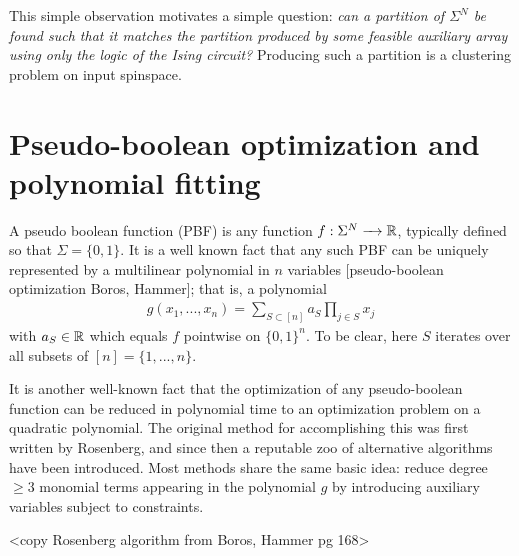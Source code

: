 \documentclass{article}
\begin{document}
This simple observation motivates a simple question: \emph{can a partition of $\Sigma^N$ be found such that it matches the partition produced by some feasible auxiliary array using only the logic of the Ising circuit?} Producing such a partition is a clustering problem on input spinspace.

\section{Pseudo-boolean optimization and polynomial fitting}
A pseudo boolean function (PBF) is any function $f:\Sigma^N\to \bR$, typically defined so that $\Sigma = \{0,1\}$. It is a well known fact that any such PBF can be uniquely represented by a multilinear polynomial in $n$ variables [pseudo-boolean optimization Boros, Hammer]; that is, a polynomial
\begin{align*}
  g(x_1,...,x_n) = \sum_{S \subset [n]} a_S \prod_{j \in S}x_j
\end{align*}
with $a_S \in \mathbb{R}$ which equals $f$ pointwise on $\{0,1\}^n$. To be clear, here $S$ iterates over all subsets of $[n] = \{1,...,n\}$.

It is another well-known fact that the optimization of any pseudo-boolean function can be reduced in polynomial time to an optimization problem on a quadratic polynomial. The original method for accomplishing this was first written by Rosenberg, and since then a reputable zoo of alternative algorithms have been introduced. Most methods share the same basic idea: reduce degree $\geq 3$ monomial terms appearing in the polynomial $g$ by introducing auxiliary variables subject to constraints.

<copy Rosenberg algorithm from Boros, Hammer pg 168>
\end{document}
